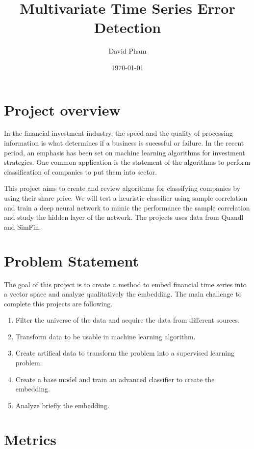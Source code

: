 \documentclass[a4paper,twoside]{article}
\author{David Pham}
\date{\today}
\title{Multivariate Time Series Error Detection}
\begin{document}
\maketitle
\tableofcontents


\section{Project overview}
\label{sec:orgb24a6b5}

In the financial investment industry, the speed and the quality of processing
information is what determines if a business is sucessful or failure. In the
recent period, an emphasis has been set on machine learning algorithms for
investment strategies. One common application is the statement of the algorithms
to perform classification of companies to put them into sector.

This project aims to create and review algorithms for classifying companies by
using their share price. We will test a heuristic classifier using sample
correlation and train a deep neural network to mimic the performance the sample
correlation and study the hidden layer of the network. The projects uses data
from Quandl and SimFin.

\section{Problem Statement}
\label{sec:orgb711bc6}

The goal of this project is to create a method to embed financial time series
into a vector space and analyze qualitatively the embedding. The main
challenge to complete this projects are following.

\begin{enumerate}
\item Filter the universe of the data and acquire the data from different
sources.
\item Transform data to be usable in machine learning algorithm.
\item Create artifical data to transform the problem into a supervised learning problem.
\item Create a base model and train an advanced classifier to create the embedding.
\item Analyze briefly the embedding.
\end{enumerate}


\section{Metrics}
\label{sec:org7a915c3}
\end{document}
